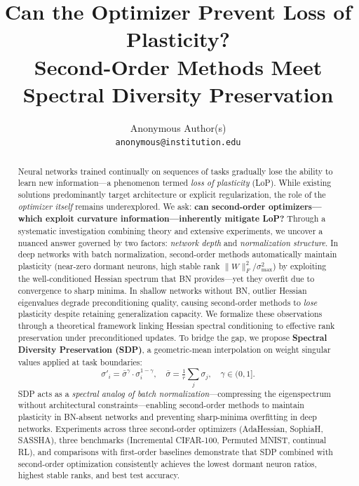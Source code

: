 \documentclass{article}
\title{Can the Optimizer Prevent Loss of Plasticity? \\ Second-Order Methods Meet Spectral Diversity Preservation}
\author{%
  Anonymous Author(s) \\
  \texttt{anonymous@institution.edu}
}
\begin{document}
\maketitle

\begin{abstract}
Neural networks trained continually on sequences of tasks gradually lose the ability to learn new information---a phenomenon termed \emph{loss of plasticity} (LoP). While existing solutions predominantly target architecture or explicit regularization, the role of the \emph{optimizer itself} remains underexplored. We ask: \textbf{can second-order optimizers---which exploit curvature information---inherently mitigate LoP?} Through a systematic investigation combining theory and extensive experiments, we uncover a nuanced answer governed by two factors: \emph{network depth} and \emph{normalization structure}. In deep networks with batch normalization, second-order methods automatically maintain plasticity (near-zero dormant neurons, high stable rank $\|W\|_F^2/\sigma_{\max}^2$) by exploiting the well-conditioned Hessian spectrum that BN provides---yet they overfit due to convergence to sharp minima. In shallow networks without BN, outlier Hessian eigenvalues degrade preconditioning quality, causing second-order methods to \emph{lose} plasticity despite retaining generalization capacity. We formalize these observations through a theoretical framework linking Hessian spectral conditioning to effective rank preservation under preconditioned updates. To bridge the gap, we propose \textbf{Spectral Diversity Preservation (SDP)}, a geometric-mean interpolation on weight singular values applied at task boundaries:
\[
  \sigma'_i = \bar{\sigma}^\gamma \cdot \sigma_i^{1-\gamma},\quad \bar{\sigma} = \tfrac{1}{r}\textstyle\sum_j \sigma_j,\quad \gamma\in(0,1].
\]
SDP acts as a \emph{spectral analog of batch normalization}---compressing the eigenspectrum without architectural constraints---enabling second-order methods to maintain plasticity in BN-absent networks and preventing sharp-minima overfitting in deep networks. Experiments across three second-order optimizers (AdaHessian, SophiaH, SASSHA), three benchmarks (Incremental CIFAR-100, Permuted MNIST, continual RL), and comparisons with first-order baselines demonstrate that SDP combined with second-order optimization consistently achieves the lowest dormant neuron ratios, highest stable ranks, and best test accuracy.
\end{abstract}

\end{document}
